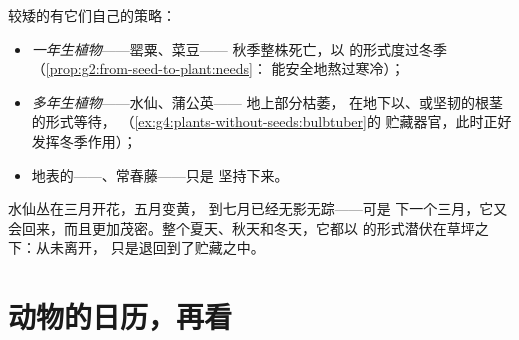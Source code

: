 \begin{proposition}[草本层的冬季应对]\label{prop:g6:life-through-seasons:herbs}
较矮的有它们自己的策略：
\begin{itemize}
  \item \emph{一年生植物}——罂粟、菜豆——
        秋季整株死亡，以
        \emph{}的形式度过冬季（\cref{prop:g2:from-seed-to-plant:needs}：
        能安全地熬过寒冷）；
  \item \emph{多年生植物}——水仙、蒲公英——
        地上部分枯萎，
        在地下以、或坚韧的根茎的形式等待，
        （\cref{ex:g4:plants-without-seeds:bulbtuber}的
        贮藏器官，此时正好发挥冬季作用）；
  \item 地表的——、常春藤——只是
        坚持下来。
\end{itemize}
\end{proposition}
\admitted

\begin{example}[水仙去哪儿了？]\label{ex:g6:life-through-seasons:daffodil}
水仙丛在三月开花，五月变黄，
到七月已经无影无踪——可是
下一个三月，它又会回来，而且更加茂密。整个夏天、秋天和冬天，它都以
的形式潜伏在草坪之下：从未离开，
只是退回到了贮藏之中。
\end{example}

\section{动物的日历，再看}

